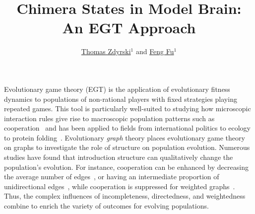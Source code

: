 \documentclass[pdflatex,lineno,referee,sn-mathphys-ay]{sn-jnl}
\begin{document}
\title{Chimera States in  Model Brain: An EGT Approach}

\author{
\href{https://orcid.org/0000-0003-3039-172X}{Thomas Zdyrski}$^{1}$
and
\href{https://orcid.org/0000-0001-8252-1990}{Feng Fu}$^{1}$
}




\maketitle

Evolutionary game theory (EGT) is the application
of evolutionary fitness dynamics
to populations of non-rational players with fixed strategies playing repeated games.
This tool is particularly well-suited to studying how microscopic interaction rules
give rise to macroscopic population patterns
such as cooperation~\citep[\eg{}][and sources therein]{sigmund1999evolutionary}
and has been applied to fields from international politics to ecology
to protein folding~\citep[\cf{}][and references therein]{traulsen2023future}.
Evolutionary \emph{graph} theory places evolutionary game theory
on graphs to investigate the role of structure on population evolution.
Numerous studies have found that introduction structure
can qualitatively change the population's evolution.
For instance, cooperation can be enhanced by
decreasing the average number of edges~\citep{ohtsuki2006simple},
or having an intermediate proportion
of unidirectional edges~\citep{su2022evolution},
while cooperation is suppressed
for weighted graphs~\citep{bhaumik2024constant}.
Thus, the complex influences of
incompleteness, directedness, and weightedness combine
to enrich the variety of outcomes for evolving populations.
\end{document}
